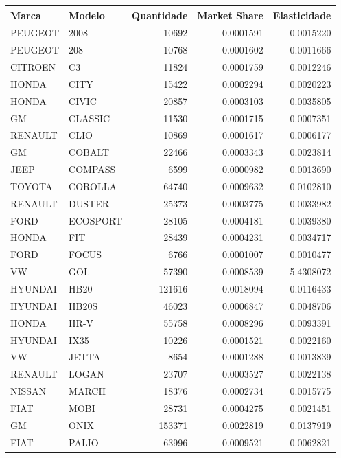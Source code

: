 \documentclass{article}
\begin{document}
\begin{table}[H]
\centering
\begin{tabular}{l|l|r|r|r}
Marca & Modelo & Quantidade & Market Share & Elasticidade\\
\hline\hline
PEUGEOT & 2008 & 10692 & 0.0001591 & 0.0015220\\
\hline
PEUGEOT & 208 & 10768 & 0.0001602 & 0.0011666\\
\hline
CITROEN & C3 & 11824 & 0.0001759 & 0.0012246\\
\hline
HONDA & CITY & 15422 & 0.0002294 & 0.0020223\\
\hline
HONDA & CIVIC & 20857 & 0.0003103 & 0.0035805\\
\hline
GM & CLASSIC & 11530 & 0.0001715 & 0.0007351\\
\hline
RENAULT & CLIO & 10869 & 0.0001617 & 0.0006177\\
\hline
GM & COBALT & 22466 & 0.0003343 & 0.0023814\\
\hline
JEEP & COMPASS & 6599 & 0.0000982 & 0.0013690\\
\hline
TOYOTA & COROLLA & 64740 & 0.0009632 & 0.0102810\\
\hline
RENAULT & DUSTER & 25373 & 0.0003775 & 0.0033982\\
\hline
FORD & ECOSPORT & 28105 & 0.0004181 & 0.0039380\\
\hline
HONDA & FIT & 28439 & 0.0004231 & 0.0034717\\
\hline
FORD & FOCUS & 6766 & 0.0001007 & 0.0010477\\
\hline
VW & GOL & 57390 & 0.0008539 & -5.4308072\\
\hline
HYUNDAI & HB20 & 121616 & 0.0018094 & 0.0116433\\
\hline
HYUNDAI & HB20S & 46023 & 0.0006847 & 0.0048706\\
\hline
HONDA & HR-V & 55758 & 0.0008296 & 0.0093391\\
\hline
HYUNDAI & IX35 & 10226 & 0.0001521 & 0.0022160\\
\hline
VW & JETTA & 8654 & 0.0001288 & 0.0013839\\
\hline
RENAULT & LOGAN & 23707 & 0.0003527 & 0.0022138\\
\hline
NISSAN & MARCH & 18376 & 0.0002734 & 0.0015775\\
\hline
FIAT & MOBI & 28731 & 0.0004275 & 0.0021451\\
\hline
GM & ONIX & 153371 & 0.0022819 & 0.0137919\\
\hline
FIAT & PALIO & 63996 & 0.0009521 & 0.0062821\\

\end{tabular}
\end{table}
\end{document}
